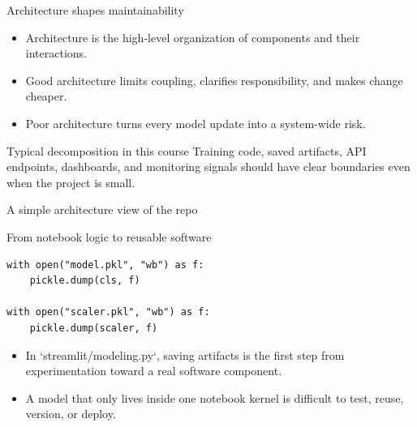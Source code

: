 \begin{frame}{Architecture shapes maintainability}
\begin{itemize}
\item Architecture is the high-level organization of components and their interactions.
\item Good architecture limits coupling, clarifies responsibility, and makes change cheaper.
\item Poor architecture turns every model update into a system-wide risk.
\end{itemize}
\begin{block}{Typical decomposition in this course}
Training code, saved artifacts, API endpoints, dashboards, and monitoring signals should have clear boundaries even when the project is small.
\end{block}
\coursefooter
\end{frame}

\begin{frame}{A simple architecture view of the repo}
\centering
{}
\coursefooter
\end{frame}

\begin{frame}[fragile]{From notebook logic to reusable software}
\begin{lstlisting}[style=coursepython]
with open("model.pkl", "wb") as f:
    pickle.dump(cls, f)

with open("scaler.pkl", "wb") as f:
    pickle.dump(scaler, f)
\end{lstlisting}
\begin{itemize}
\item In `streamlit/modeling.py`, saving artifacts is the first step from experimentation toward a real software component.
\item A model that only lives inside one notebook kernel is difficult to test, reuse, version, or deploy.
\end{itemize}
\coursefooter
\end{frame}

